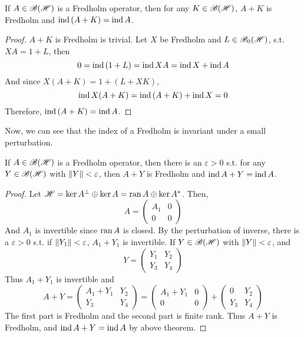 \documentclass[a4paper,11pt]{report}
\begin{document}
\begin{thm}
	If $A \in \mathscr{B(H)}$ is a Fredholm operator, then for any $K \in \mathscr{B(H)}$, $A+K$ is Fredholm and $\operatorname{ind}{(A+K)} = \operatorname{ind}{A}$.
\end{thm}
\begin{proof}
	$A+K$ is Fredholm is trivial. Let $X$ be Fredholm and $L \in \mathscr{B}_{0}\mathscr{(H)}$, s.t. $XA = 1+L$, then
	\begin{equation*}
		0 = \operatorname{ind}{(1+L)} = \operatorname{ind}{XA} = \operatorname{ind}{X} + \operatorname{ind}{A}
	\end{equation*}
	And since $X(A+K) = 1+(L+XK)$, 
	\begin{equation*}
		\operatorname{ind}{X(A+K)} = \operatorname{ind}{(A+K)} + \operatorname{ind}{X} = 0
	\end{equation*}
	Therefore, $\operatorname{ind}{(A+K)} = \operatorname{ind}{A}$.
\end{proof}

Now, we can see that the index of a Fredholm is invariant under a small perturbation.

\begin{thm}
	If $A \in \mathscr{B(H)}$ is a Fredholm operator, then there is an $\varepsilon>0$ s.t. for any $Y \in \mathscr{B(H)}$ with $\left\lVert Y\right\lVert < \varepsilon$, then $A+Y$ is Fredholm and $\operatorname{ind}{A+Y} = \operatorname{ind}{A}$.
\end{thm}
\begin{proof}
	Let $\mathscr{H} = \ker{A}^{\bot} \oplus \ker{A} = \operatorname{ran}{A} \oplus \ker{A^{*}}$. Then,
	\begin{equation*}
		A = \left(
			\begin{array}{cc}
				A_1 & 0 \\
				0 & 0
			\end{array}
		\right)
	\end{equation*}
	And $A_1$ is invertible since $\operatorname{ran}{A}$ is closed. By the perturbation of inverse, there is a $\varepsilon > 0$ s.t. if $\left\lVert Y_1\right\lVert < \varepsilon$, $A_1+Y_1$ is invertible. If $Y \in \mathscr{B(H)}$ with $\left\lVert Y\right\lVert < \varepsilon$, and 
	\begin{equation*}
		Y = \left(
				\begin{array}{cc}
				Y_1 & Y_2 \\
				Y_3 & Y_4
				\end{array}
			\right)
	\end{equation*}
	Thus $A_1+Y_1$ is invertible and 
	\begin{equation*}
		A + Y =
		\left(
			\begin{array}{cc}
			A_1+Y_1 & Y_2 \\
			Y_3 & Y_4
			\end{array}
		\right)
		= 
		\left(
			\begin{array}{cc}
				A_1+Y_1 & 0 \\
				0 & 0
			\end{array}
		\right)
		+
		\left(
			\begin{array}{cc}
			0 & Y_2 \\
			Y_3 & Y_4
			\end{array}
		\right)
	\end{equation*}
	The first part is Fredholm and the second part is finite rank. Thus $A+Y$ is Fredholm, and $\operatorname{ind}{A+Y} = \operatorname{ind}{A}$ by above theorem.
\end{proof}
\end{document}
